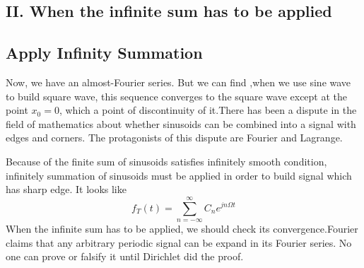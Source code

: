 \documentclass[margin,line]{res}
\begin{document}
\begin{resume}
\section{\sc II. When the infinite sum has to be applied}
\subsection{\textbf{Apply Infinity Summation}}
Now, we have an almost-Fourier series. But we can find ,when we use sine wave to build square wave, this sequence converges to the square wave except at the point $x_0 = 0$, which a point of discontinuity of it.There has been a dispute in the field of mathematics about whether sinusoids can be combined into a signal with edges and corners. The protagonists of this dispute are Fourier and Lagrange. \par
Because of the finite sum of sinusoids satisfies infinitely smooth condition, infinitely summation of sinusoids must be applied in order to build signal which has sharp edge. It looks like 
$$
f_T(t) = \sum\limits_{n=-\infty}^{\infty} {C_n e^{jn\Omega t}}
$$
When the infinite sum has to be applied, we should check its convergence.Fourier claims that any arbitrary periodic signal can be expand in its Fourier series. No one can prove or falsify it until Dirichlet did the proof. \par


\end{resume}
\end{document}
